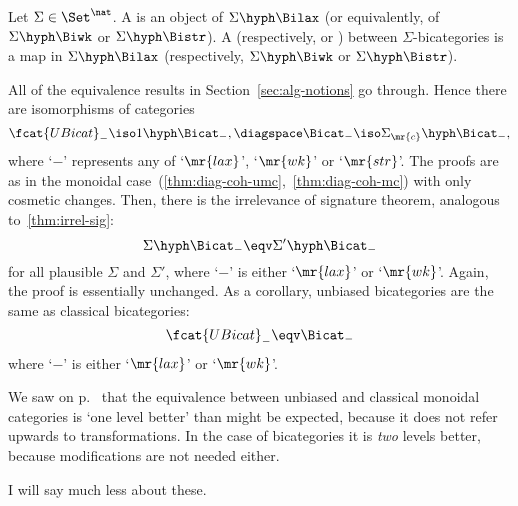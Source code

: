 \begin{defn}%
%
%
%
%
Let $\Sigma\in\Set^\nat$.  A  is an object of
$\Sigma\hyph\Bilax$ (or equivalently, of $\Sigma\hyph\Biwk$ or
$\Sigma\hyph\Bistr$).  A  (respectively,  or
) %
%
%
between $\Sigma$-bicategories is a map in
$\Sigma\hyph\Bilax$ (respectively, $\Sigma\hyph\Biwk$ or
$\Sigma\hyph\Bistr$).
\end{defn}

All of the equivalence results in Section~\ref{sec:alg-notions} go
through.  Hence there are isomorphisms of categories%
%
%
%
%
\[
\fcat{UBicat}_{-} \iso 1\hyph\Bicat_{-},
\diagspace
\Bicat_{-} \iso \Sigma_\mr{c}\hyph\Bicat_{-},
\]
where `$-$' represents any of `$\mr{lax}$', `$\mr{wk}$' or
`$\mr{str}$'.  The proofs are as in the monoidal
case~(\ref{thm:diag-coh-umc},~\ref{thm:diag-coh-mc}) with only cosmetic
changes.  Then, there is the irrelevance%
%
%
%
%
%
of signature theorem, analogous
to~\ref{thm:irrel-sig}:
\[
\Sigma\hyph\Bicat_{-} \eqv \Sigma'\hyph\Bicat_{-}
\]
for all plausible $\Sigma$ and $\Sigma'$, where `$-$' is either
`$\mr{lax}$' or `$\mr{wk}$'.  Again, the proof is essentially unchanged.
As a corollary, unbiased bicategories are the same as classical
bicategories:%
%
%
\[
\fcat{UBicat}_{-} \eqv \Bicat_{-}
\]
where `$-$' is either `$\mr{lax}$' or `$\mr{wk}$'.  

We saw on p.~\pageref{p:one-level-better} that the equivalence between
unbiased and classical monoidal categories is `one level better' than might
be expected, because it does not refer upwards to transformations.  In the
case of bicategories it is \emph{two} levels better, because modifications
are not needed either.





I will say much less about these.  

